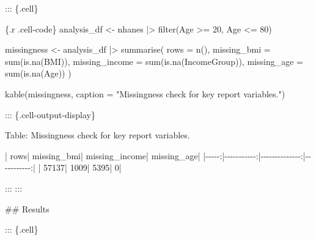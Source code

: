 \documentclass[
  letterpaper,
  DIV=11,
  numbers=noendperiod,
  oneside]{scrreprt}
\newenvironment{Shaded}{\begin{snugshade}}{\end{snugshade}}
\newcommand{\AttributeTok}[1]{\textcolor[rgb]{0.40,0.45,0.13}{#1}}
\newcommand{\DecValTok}[1]{\textcolor[rgb]{0.68,0.00,0.00}{#1}}
\newcommand{\FunctionTok}[1]{\textcolor[rgb]{0.28,0.35,0.67}{#1}}
\newcommand{\InformationTok}[1]{\textcolor[rgb]{0.37,0.37,0.37}{#1}}
\newcommand{\NormalTok}[1]{\textcolor[rgb]{0.00,0.23,0.31}{#1}}
\newcommand{\OtherTok}[1]{\textcolor[rgb]{0.00,0.23,0.31}{#1}}
\newcommand{\PreprocessorTok}[1]{\textcolor[rgb]{0.68,0.00,0.00}{#1}}
\newcommand{\SpecialCharTok}[1]{\textcolor[rgb]{0.37,0.37,0.37}{#1}}
\newcommand{\StringTok}[1]{\textcolor[rgb]{0.13,0.47,0.30}{#1}}
\begin{document}
\begin{Shaded}
\begin{Highlighting}[numbers=left,,]
\NormalTok{::: \{.cell\}}

\InformationTok{\textasciigrave{}\textasciigrave{}\textasciigrave{}\{.r .cell{-}code\}}
\NormalTok{analysis\_df }\OtherTok{\textless{}{-}}\NormalTok{ nhanes }\SpecialCharTok{|\textgreater{}}
  \FunctionTok{filter}\NormalTok{(Age }\SpecialCharTok{\textgreater{}=} \DecValTok{20}\NormalTok{, Age }\SpecialCharTok{\textless{}=} \DecValTok{80}\NormalTok{)}

\NormalTok{missingness }\OtherTok{\textless{}{-}}\NormalTok{ analysis\_df }\SpecialCharTok{|\textgreater{}}
  \FunctionTok{summarise}\NormalTok{(}
    \AttributeTok{rows =} \FunctionTok{n}\NormalTok{(),}
    \AttributeTok{missing\_bmi =} \FunctionTok{sum}\NormalTok{(}\FunctionTok{is.na}\NormalTok{(BMI)),}
    \AttributeTok{missing\_income =} \FunctionTok{sum}\NormalTok{(}\FunctionTok{is.na}\NormalTok{(IncomeGroup)),}
    \AttributeTok{missing\_age =} \FunctionTok{sum}\NormalTok{(}\FunctionTok{is.na}\NormalTok{(Age))}
\NormalTok{  )}

\FunctionTok{kable}\NormalTok{(missingness, }\AttributeTok{caption =} \StringTok{"Missingness check for key report variables."}\NormalTok{)}
\InformationTok{\textasciigrave{}\textasciigrave{}\textasciigrave{}}

\NormalTok{::: \{.cell{-}output{-}display\}}


\NormalTok{Table: Missingness check for key report variables.}

\PreprocessorTok{|}\NormalTok{  rows}\PreprocessorTok{|}\NormalTok{ missing\_bmi}\PreprocessorTok{|}\NormalTok{ missing\_income}\PreprocessorTok{|}\NormalTok{ missing\_age}\PreprocessorTok{|}
\PreprocessorTok{|{-}{-}{-}{-}{-}:|{-}{-}{-}{-}{-}{-}{-}{-}{-}{-}{-}:|{-}{-}{-}{-}{-}{-}{-}{-}{-}{-}{-}{-}{-}{-}:|{-}{-}{-}{-}{-}{-}{-}{-}{-}{-}{-}:|}
\PreprocessorTok{|}\NormalTok{ 57137}\PreprocessorTok{|}\NormalTok{        1009}\PreprocessorTok{|}\NormalTok{           5395}\PreprocessorTok{|}\NormalTok{           0}\PreprocessorTok{|}


\NormalTok{:::}
\NormalTok{:::}


\FunctionTok{\#\# Results}


\NormalTok{::: \{.cell\}}


\end{Highlighting}
\end{Shaded}
\end{document}
